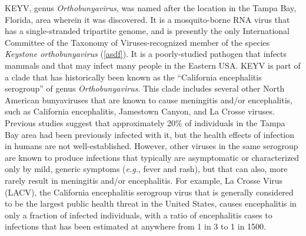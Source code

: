 \documentclass[12pt]{article}
\newcommand{\eg}{\textit{e.g.}}
\begin{document}
        KEYV, genus \emph{Orthobunyavirus}, was named after the location in the Tampa Bay, Florida, area wherein it was discovered. It is a mosquito-borne RNA virus that has a single-stranded tripartite genome, and is presently the only International Committee of the Taxonomy of Viruses-recognized member of the species \emph{Keystone orthobunyavirus} (\ref{asdf}). %
        It is a poorly-studied pathogen that infects mammals and that may infect many people in the Eastern USA. KEYV is part of a clade that has historically been known as the ``California encephalitis serogroup'' of genus \emph{Orthobunyavirus}. This clade includes several other North American bunyaviruses that are known to cause meningitis and/or encephalitis, such as California encephalitis, Jamestown Canyon, and La Crosse viruses. Previous studies suggest that approximately 20\% of individuals in the Tampa Bay area had been previously infected with it\cite{parkin1972review}, but the health effects of infection in humans are not well-established. However, other viruses in the same serogroup are known to produce infections that typically are asymptomatic or characterized only by mild, generic symptoms (\eg, fever and rash), but that can also, more rarely result in meningitis and/or encephalitis. For example, La Crosse Virus (LACV), the California encephalitis serogroup virus that is generally considered to be the largest public health threat in the United States, causes encephalitis in only a fraction of infected individuals, with a ratio of encephalitis cases to infections that has been estimated at anywhere from 1 in 3 to 1 in 1500\cite{rust1999topical}. %

\end{document}
